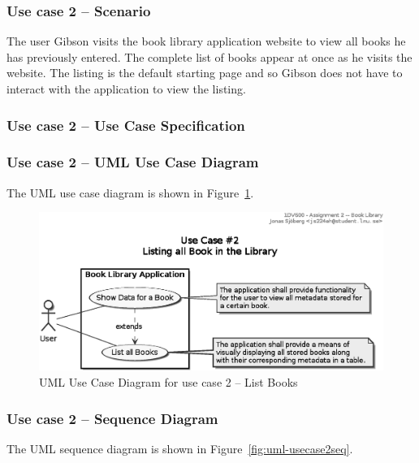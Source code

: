 \subsubsection{Use case 2 -- Scenario}\label{task-1a-usecase2}
The user Gibson visits the book library application website to view all books
he has previously entered. The complete list of books appear at once as he
visits the website. The listing is the default starting page and so Gibson does
not have to interact with the application to view the listing.


\subsubsection{Use case 2 -- Use Case Specification}\label{task-1a-usecase2spec}



\subsubsection{Use case 2 -- UML Use Case Diagram}\label{task-1a-usecase2uml}
The UML use case diagram is shown in Figure~\ref{fig:uml-usecase2}.

\begin{figure}[htbp]
  \centering
  \includegraphics[width=0.75\linewidth]{include/uml-use-case-2.eps}
  \caption{UML Use Case Diagram for use case 2 -- List Books}
  \label{fig:uml-usecase2}
\end{figure}




\subsubsection{Use case 2 -- Sequence Diagram}\label{task-1a-usecase2seq}
The UML sequence diagram is shown in Figure~\ref{fig:uml-usecase2seq}.

